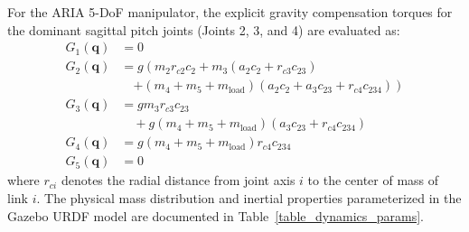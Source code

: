 \documentclass[journal]{IEEEtran}
\begin{document}
For the ARIA 5-DoF manipulator, the explicit gravity compensation torques for the dominant sagittal pitch joints (Joints 2, 3, and 4) are evaluated as:
\begin{align}
G_1(\mathbf{q}) &= 0 \\
G_2(\mathbf{q}) &= g \left( m_2 r_{c2} c_2 + m_3 (a_2 c_2 + r_{c3} c_{23}) \right. \nonumber \\
                &\quad \left. + (m_4 + m_5 + m_{\text{load}}) (a_2 c_2 + a_3 c_{23} + r_{c4} c_{234}) \right) \\
G_3(\mathbf{q}) &= g m_3 r_{c3} c_{23} \nonumber \\
                &\quad + g (m_4 + m_5 + m_{\text{load}}) (a_3 c_{23} + r_{c4} c_{234}) \\
G_4(\mathbf{q}) &= g (m_4 + m_5 + m_{\text{load}}) r_{c4} c_{234} \\
G_5(\mathbf{q}) &= 0
\end{align}
where $r_{ci}$ denotes the radial distance from joint axis $i$ to the center of mass of link $i$. The physical mass distribution and inertial properties parameterized in the Gazebo URDF model are documented in Table~\ref{table_dynamics_params}.

\begin{table}[!t]
\centering
\caption{Mass Distribution and Principal Inertia Parameters for Dynamic Modeling}
\label{table_dynamics_params}
\footnotesize
{}
\end{table}
\end{document}
